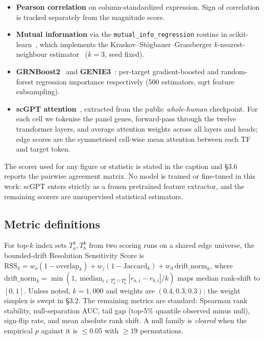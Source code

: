 \documentclass[12pt]{article}
\begin{document}
\begin{itemize}
\item \textbf{Pearson correlation} on column-standardized expression.
      Sign of correlation is tracked separately from the magnitude score.
\item \textbf{Mutual information} via the \texttt{mutual\_info\_regression}
      routine in scikit-learn~\citep{Pedregosa2011}, which implements
      the Kraskov--St\"ogbauer--Grassberger $k$-nearest-neighbour
      estimator~\citep{Kraskov2004} ($k=3$, seed fixed).
\item \textbf{GRNBoost2}~\citep{Moerman2019} and
      \textbf{GENIE3}~\citep{Huynh-Thu2010}: per-target gradient-boosted
      and random-forest regression importance respectively (500
      estimators, sqrt feature subsampling).
\item \textbf{scGPT attention}~\citep{Cui2024}, extracted from the public
      \emph{whole-human} checkpoint. For each cell we tokenise the panel
      genes, forward-pass through the twelve transformer layers, and
      average attention weights across all layers and heads; edge scores
      are the symmetrised cell-wise mean attention between each TF and
      target token.
\end{itemize}

The scorer used for any figure or statistic is stated in the caption
and §3.6 reports the pairwise agreement matrix. No model is trained or
fine-tuned in this work: scGPT enters strictly as a frozen pretrained
feature extractor, and the remaining scorers are unsupervised
statistical estimators.

\subsection{Metric definitions}

For top-$k$ index sets $T_a^k, T_b^k$ from two scoring runs on a shared
edge universe, the bounded-drift Resolution Sensitivity Score is
$\text{RSS}_k = w_o(1 - \text{overlap}_k) + w_j(1 - \text{Jaccard}_k) + w_d\,\text{drift\_norm}_k$,
where $\text{drift\_norm}_k = \min(1, \operatorname{median}_{i \in T_a^k \cap T_b^k}|r_{a,i} - r_{b,i}|/k)$
maps median rank-shift to $[0, 1]$. Unless noted, $k = 1{,}000$ and
weights are $(0.4, 0.3, 0.3)$; the weight simplex is swept in §3.2.
The remaining metrics are standard: Spearman rank stability,
null-separation AUC, tail gap (top-5\% quantile observed minus null),
sign-flip rate, and mean absolute rank shift. A null family is
\emph{cleared} when the empirical $p$ against it is $\leq 0.05$
with $\geq 19$ permutations.
\end{document}
